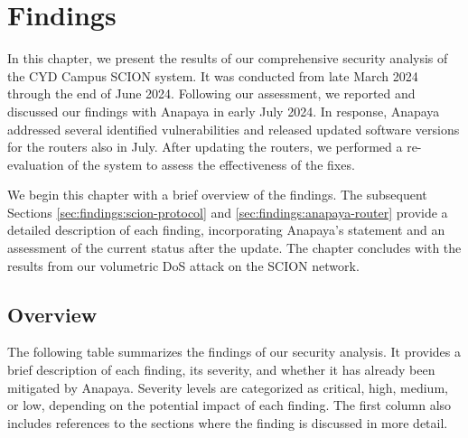 \chapter{Findings}
\label{ch:findings}


In this chapter, we present the results of our comprehensive security analysis of the CYD Campus SCION system.
It was conducted from late March 2024 through the end of June 2024.
Following our assessment, we reported and discussed our findings with Anapaya in early July 2024.
In response, Anapaya addressed several identified vulnerabilities and released updated software versions for the routers also in July.
After updating the routers, we performed a re-evaluation of the system to assess the effectiveness of the fixes.

We begin this chapter with a brief overview of the findings.
The subsequent Sections \cref{sec:findings:scion-protocol} and \cref{sec:findings:anapaya-router} provide a detailed description of each finding, incorporating Anapaya's statement and an assessment of the current status after the update.
The chapter concludes with the results from our volumetric DoS attack on the SCION network.

\section{Overview}
\label{sec:findings:overview}

The following table summarizes the findings of our security analysis.
It provides a brief description of each finding, its severity, and whether it has already been mitigated by Anapaya.
Severity levels are categorized as critical, high, medium, or low, depending on the potential impact of each finding.
The first column also includes references to the sections where the finding is discussed in more detail.

